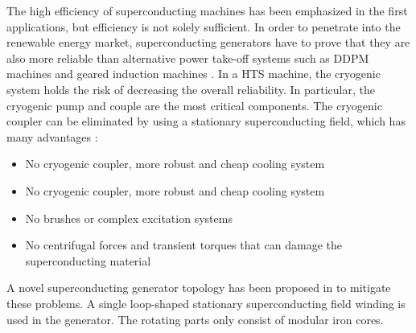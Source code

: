 \documentclass[a4paper, 11pt]{article} %
\begin{document}
The high efficiency of superconducting machines has been emphasized in the first applications, but efficiency is not solely sufficient. In order to penetrate into the renewable energy market,  superconducting generators have to prove that they are also more reliable than alternative power take-off systems such as DDPM machines and geared induction machines \cite{Abrahamsen2010}. In a HTS machine, the cryogenic system holds the risk of decreasing the overall reliability. In particular, the cryogenic pump and couple are the most critical components. The cryogenic coupler can be eliminated by using a stationary superconducting field, which has many advantages \cite{Gieras2008a}:

\begin{itemize}
	\item No cryogenic coupler, more robust and cheap cooling system
	\item No cryogenic coupler, more robust and cheap cooling system
	\item No brushes or complex excitation systems
	\item No centrifugal forces and transient torques that can damage the superconducting material
\end{itemize}

A novel superconducting generator topology has been proposed in \cite{Keysan2011e} to mitigate these problems. A single loop-shaped stationary superconducting field winding is used in the generator. The rotating parts only consist of modular iron cores. 







\end{document}
